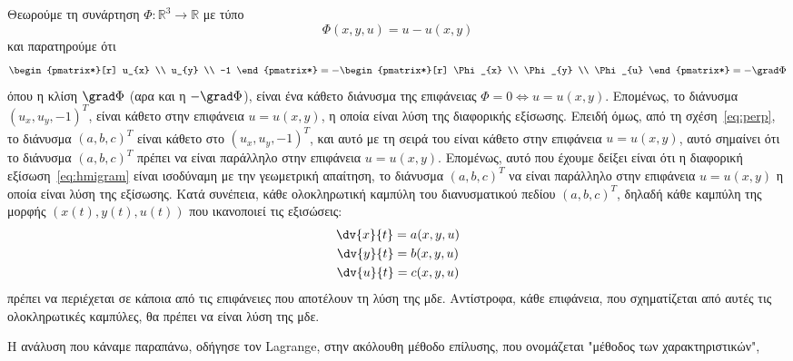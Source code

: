 Θεωρούμε τη συνάρτηση $ \Phi \colon \mathbb{R}^{3} \to \mathbb{R} $ με τύπο 
\[
  \Phi(x,y,u)=u-u(x,y) 
 \] 
 και παρατηρούμε ότι 
 \[
   \begin{pmatrix*}[r] u_{x} \\ u_{y} \\ -1 \end{pmatrix*} = -
   \begin{pmatrix*}[r] \Phi _{x} \\ \Phi _{y} \\ \Phi _{u} \end{pmatrix*} = 
  - \grad \Phi 
  \]
  όπου η κλίση $ \grad \Phi $ (αρα και η $ - \grad \Phi $), είναι ένα κάθετο διάνυσμα 
  της επιφάνειας $ \Phi = 0 \Leftrightarrow u=u(x,y) $. Επομένως, το διάνυσμα 
  $ (u_{x},u_{y},-1)^{T} $, είναι κάθετο στην επιφάνεια $ u=u(x,y) $, η οποία είναι 
  λύση της διαφορικής εξίσωσης.
  Επειδή όμως, από τη σχέση~\eqref{eq:perp}, το διάνυσμα $ (a,b,c)^{T} $ 
  είναι κάθετο στο $ (u_{x},u_{y},-1)^{T} $, και αυτό με τη σειρά του είναι κάθετο 
  στην επιφάνεια $ u=u(x,y) $, αυτό σημαίνει ότι το διάνυσμα 
  $ (a,b,c)^{T} $ πρέπει να είναι παράλληλο στην επιφάνεια $ u=u(x,y) $. Επομένως, 
  αυτό που έχουμε δείξει είναι ότι η διαφορική εξίσωση~\eqref{eq:hmigram} είναι 
  ισοδύναμη με την γεωμετρική απαίτηση, το διάνυσμα $ (a,b,c)^{T} $ να είναι παράλληλο
  στην επιφάνεια $ u=u(x,y) $ η οποία είναι λύση της εξίσωσης. 
  Κατά συνέπεια, κάθε ολοκληρωτική καμπύλη του διανυσματικού πεδίου $ (a,b,c)^{T} $,
  δηλαδή κάθε καμπύλη της μορφής $ (x(t),y(t),u(t)) $ που ικανοποιεί τις εξισώσεις:
  \begin{gather*}
    \dv{x}{t} = a(x,y,u) \\
    \dv{y}{t} = b(x,y,u) \\
    \dv{u}{t} = c(x,y,u) 
   \end{gather*} 
   πρέπει να περιέχεται σε κάποια από τις επιφάνειες που αποτέλουν τη λύση της μδε. 
   Αντίστροφα, κάθε επιφάνεια, που σχηματίζεται από αυτές τις ολοκληρωτικές καμπύλες, 
   θα πρέπει να είναι λύση της μδε.

   Η ανάλυση που κάναμε παραπάνω, οδήγησε τον Lagrange, στην ακόλουθη μέθοδο επίλυσης, 
   που ονομάζεται "μέθοδος των χαρακτηριστικών", 






